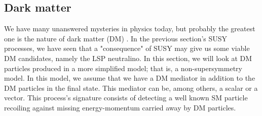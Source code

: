 \subsection{Dark matter}
\label{sec:DM}
We have many unanswered mysteries in physics today, but probably the greatest one is the nature of dark matter (DM) \cite{monoZexclusion}. In the previous section's SUSY processes, we have seen that a "consequence" of SUSY may give us some viable DM candidates, namely the LSP neutralino. In this section, we will look at DM particles produced in a more simplified model; that is, a non-supersymmetry model. In this model, we assume that we have a DM mediator in addition to the DM particles in the final state. This mediator can be, among others, a scalar or a vector. This process's signature consists of detecting a well known SM particle recoiling against missing energy-momentum carried away by DM particles. 

